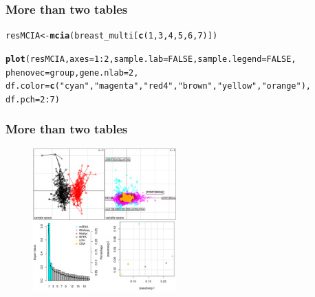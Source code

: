 \documentclass[10pt,xcolor=dvipsnames]{beamer}\usepackage[]{graphicx}\usepackage[]{color}
\makeatletter
\newcommand{\hlnum}[1]{\textcolor[rgb]{0.686,0.059,0.569}{#1}}%
\newcommand{\hlstr}[1]{\textcolor[rgb]{0.192,0.494,0.8}{#1}}%
\newcommand{\hlopt}[1]{\textcolor[rgb]{0,0,0}{#1}}%
\newcommand{\hlstd}[1]{\textcolor[rgb]{0.345,0.345,0.345}{#1}}%
\newcommand{\hlkwb}[1]{\textcolor[rgb]{0.69,0.353,0.396}{#1}}%
\newcommand{\hlkwc}[1]{\textcolor[rgb]{0.333,0.667,0.333}{#1}}%
\newcommand{\hlkwd}[1]{\textcolor[rgb]{0.737,0.353,0.396}{\textbf{#1}}}%
\newenvironment{kframe}{%
 \def\at@end@of@kframe{}%
 \ifinner\ifhmode%
  \def\at@end@of@kframe{\end{minipage}}%
  \begin{minipage}{\columnwidth}%
 \fi\fi%
 \def\FrameCommand##1{\hskip\@totalleftmargin \hskip-\fboxsep
 \colorbox{shadecolor}{##1}\hskip-\fboxsep
     \hskip-\linewidth \hskip-\@totalleftmargin \hskip\columnwidth}%
 \MakeFramed {\advance\hsize-\width
   \@totalleftmargin\z@ \linewidth\hsize
   \@setminipage}}%
 {\par\unskip\endMakeFramed%
 \at@end@of@kframe}
\newenvironment{knitrout}{}{} %
\makeatother
\begin{document}
\begin{frame}\frametitle{More than two tables}


\begin{knitrout}\footnotesize
{}\color{fgcolor}\begin{kframe}
\begin{alltt}
\hlstd{resMCIA} \hlkwb{<-} \hlkwd{mcia}\hlstd{( breast_multi[} \hlkwd{c}\hlstd{(}\hlnum{1}\hlstd{,}\hlnum{3}\hlstd{,}\hlnum{4}\hlstd{,}\hlnum{5}\hlstd{,}\hlnum{6}\hlstd{,}\hlnum{7}\hlstd{) ] )}
\end{alltt}
\end{kframe}
\end{knitrout}


\begin{knitrout}\footnotesize
{}\color{fgcolor}\begin{kframe}
\begin{alltt}
\hlkwd{plot}\hlstd{(resMCIA,} \hlkwc{axes}\hlstd{=}\hlnum{1}\hlopt{:}\hlnum{2}\hlstd{,} \hlkwc{sample.lab}\hlstd{=}\hlnum{FALSE}\hlstd{,} \hlkwc{sample.legend}\hlstd{=}\hlnum{FALSE}\hlstd{,}
     \hlkwc{phenovec}\hlstd{=group,} \hlkwc{gene.nlab}\hlstd{=}\hlnum{2}\hlstd{,}
     \hlkwc{df.color}\hlstd{=}\hlkwd{c}\hlstd{(}\hlstr{"cyan"}\hlstd{,} \hlstr{"magenta"}\hlstd{,} \hlstr{"red4"}\hlstd{,} \hlstr{"brown"}\hlstd{,}\hlstr{"yellow"}\hlstd{,} \hlstr{"orange"}\hlstd{),}
     \hlkwc{df.pch}\hlstd{=}\hlnum{2}\hlopt{:}\hlnum{7}\hlstd{)}
\end{alltt}
\end{kframe}
\end{knitrout}
\end{frame}


\begin{frame}\frametitle{More than two tables}

\begin{figure}
\begin{center}
 \includegraphics[width=5.5cm]{figure/plot_mcia-1}
\end{center}
\end{figure}

\end{frame}
\end{document}
